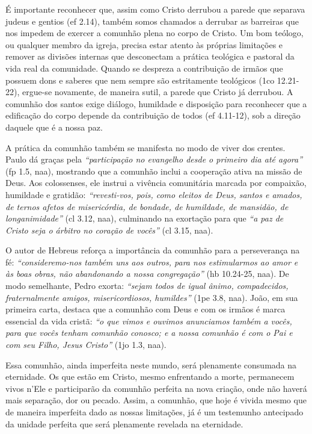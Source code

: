 É importante reconhecer que, assim como Cristo derrubou a parede que separava judeus e gentios (\gls{ef} 2.14), também somos chamados a derrubar as barreiras que nos impedem de exercer a comunhão plena no corpo de Cristo. Um bom teólogo, ou qualquer membro da igreja, precisa estar atento às próprias limitações e remover as divisões internas que desconectam a prática teológica e pastoral da vida real da comunidade. Quando se despreza a contribuição de irmãos que possuem dons e saberes que nem sempre são estritamente teológicos (\gls{1co} 12.21-22), ergue-se novamente, de maneira sutil, a parede que Cristo já derrubou. A comunhão dos santos exige diálogo, humildade e disposição para reconhecer que a edificação do corpo depende da contribuição de todos (\gls{ef} 4.11-12), sob a direção daquele que é a nossa paz.

A prática da comunhão também se manifesta no modo de viver dos crentes. Paulo dá graças pela \textit{``participação no evangelho desde o primeiro dia até agora''} (\gls{fp} 1.5, \gls{naa}), mostrando que a comunhão inclui a cooperação ativa na missão de Deus. Aos colossenses, ele instrui a vivência comunitária marcada por compaixão, humildade e gratidão: \textit{``revesti-vos, pois, como eleitos de Deus, santos e amados, de ternos afetos de misericórdia, de bondade, de humildade, de mansidão, de longanimidade''} (\gls{cl} 3.12, \gls{naa}), culminando na exortação para que \textit{``a paz de Cristo seja o árbitro no coração de vocês''} (\gls{cl} 3.15, \gls{naa}).

O autor de Hebreus reforça a importância da comunhão para a perseverança na fé: \textit{``consideremo-nos também uns aos outros, para nos estimularmos ao amor e às boas obras, não abandonando a nossa congregação''} (\gls{hb} 10.24-25, \gls{naa}). De modo semelhante, Pedro exorta: \textit{``sejam todos de igual ânimo, compadecidos, fraternalmente amigos, misericordiosos, humildes''} (\gls{1pe} 3.8, \gls{naa}). João, em sua primeira carta, destaca que a comunhão com Deus e com os irmãos é marca essencial da vida cristã: \textit{``o que vimos e ouvimos anunciamos também a vocês, para que vocês tenham comunhão conosco; e a nossa comunhão é com o Pai e com seu Filho, Jesus Cristo''} (\gls{1jo} 1.3, \gls{naa}).

Essa comunhão, ainda imperfeita neste mundo, será plenamente consumada na eternidade. Os que estão em Cristo, mesmo enfrentando a morte, permanecem vivos n'Ele e participarão da comunhão perfeita na nova criação, onde não haverá mais separação, dor ou pecado. Assim, a comunhão, que hoje é vivida mesmo que de maneira imperfeita dado as nossas limitações, já é um testemunho antecipado da unidade perfeita que será plenamente revelada na eternidade.

